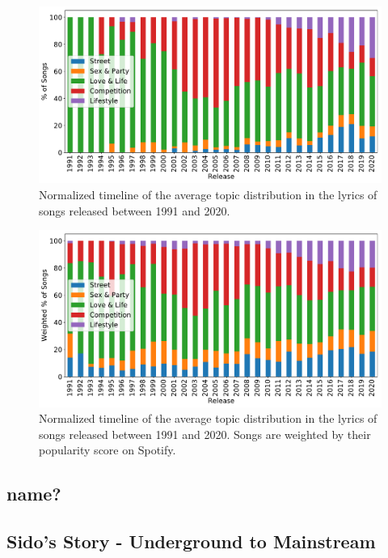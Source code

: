 \documentclass[conference]{IEEEtran}
\begin{document}
\begin{figure}[!t]
\includegraphics[width=\linewidth]{figures/timeline.pdf}
\vspace*{-8mm}
\caption{Normalized timeline of the average topic distribution in the lyrics of songs released between 1991 and 2020.}
\label{fig:timeline}
\end{figure}

\begin{figure}[!t]
\includegraphics[width=\linewidth]{figures/w_timeline.pdf}
\vspace*{-8mm}
\caption{Normalized timeline of the average topic distribution in the lyrics of songs released between 1991 and 2020. Songs are weighted by their popularity score on Spotify.}
\label{fig:w_timeline}
\end{figure}

\subsection{name?}
\subsection{Sido's Story - Underground to Mainstream}
\end{document}
